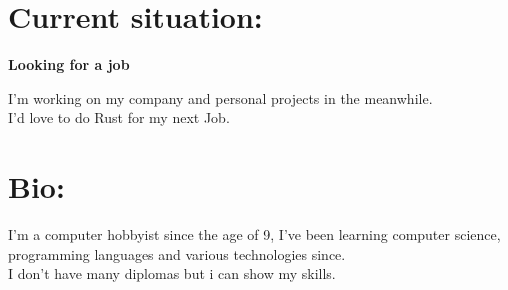 \documentclass[a4paper,10pt]{article}
\begin{document}
%
%
%
\hfill
\begin{adjustbox}{valign=t}
\begin{minipage}{0.05\textwidth} %
\MyVerticalRule  %
\end{minipage}
\end{adjustbox}
\hfill
%
\begin{adjustbox}{valign=t}
\begin{minipage}{0.6\textwidth} %
\section*{Current situation:}
\begin{description}
\raggedright
\item[\normalfont \textcolor{ColorOne}{July. 2023 -- Now.}] \textbf{Looking for a job}\\ \medskip

	\begin{spacing}{1.0}
		I'm working on my company and personal projects in the meanwhile.\\
		I'd love to do Rust for my next Job.
	\end{spacing}

\vspace{-0.9\baselineskip}
\end{description}

\section*{Bio:}
\begin{spacing}{1.0}

\vspace{-0.6\baselineskip}

\hspace{5mm} I'm a computer hobbyist since the age of 9, I've been learning computer science,
programming languages and various technologies since.\\
I don't have many diplomas but i can show my skills.
\end{spacing}
\vspace{-0.8\baselineskip}

\end{minipage}
\end{adjustbox}
\end{document}

